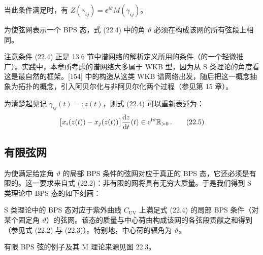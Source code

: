 当此条件满足时，有 $Z(\gamma_{ij})=\ee^{\ii\vartheta}M(\gamma_{ij})$。

\begin{remark}[22.2]
为使弦网表示一个 BPS 态，式 (22.4) 中的角 $\vartheta$ 必须在构成该网的所有弦段上相同。
\end{remark}

\begin{remark}[22.3]
注意条件 (22.4) 正是 13.6 节中谱网络的解析定义所用的条件（的一个轻微推广）。实践中，本章所考虑的谱网络大多属于 WKB 型，因为从 S 类理论的角度看这是最自然的框架。[154] 中的构造从这类 WKB 谱网络出发，随后把这一概念抽象为拓扑的概念，引入阿贝尔化与非阿贝尔化两个过程（参见第 15 章）。
\end{remark}

为清楚起见记 $\gamma_{ij}(t)=:z(t)$，则式 (22.4) 可以重新表述为：
\begin{equation}
\big[x_i(z(t))-x_j(z(t))\big]\frac{\mathrm{d} z}{\mathrm{d} t}(t)\in \mathrm{e}^{\mathrm{i}\vartheta}\mathbb{R}_{>0}\,.\tag{22.5}
\end{equation}


\subsection{有限弦网}

为使满足给定角 $\vartheta$ 的局部 BPS 条件的弦网对应于真正的 BPS 态，它还必须是有限的。这一要求来自式 (22.2)：非有限的网将具有无穷大质量。于是我们得到 S 类理论中 BPS 态的如下刻画：

\begin{proposition}[22.4]
S 类理论中的 BPS 态对应于紫外曲线 $C_{\mathrm{UV}}$ 上满足式 (22.4) 的局部 BPS 条件（对某个固定角 $\vartheta$）的弦网。该态的质量与中心荷由构成该网的各弦段贡献之和得到（参见式 (22.2) 与 (22.3)）。特别地，中心荷的辐角为 $\vartheta$。
\end{proposition}

有限 BPS 弦的例子及其 M 理论来源见图 22.3。


